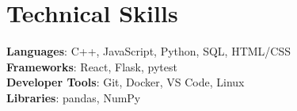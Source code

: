\documentclass[letterpaper,11pt]{article}
\begin{document}
\section{Technical Skills}
 \begin{itemize}[leftmargin=0.15in, label={}]
    \small{\item{
     \textbf{Languages}{: C++, JavaScript, Python, SQL, HTML/CSS} \\
     \textbf{Frameworks}{: React, Flask, pytest} \\
     \textbf{Developer Tools}{: Git, Docker, VS Code, Linux} \\
     \textbf{Libraries}{: pandas, NumPy}
    }}
 \end{itemize}
\end{document}
